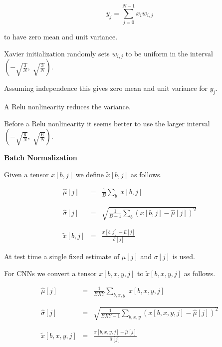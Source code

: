 {\vfill
$$y_j = \sum_{j=0}^{N-1} x_i w_{i,j}$$

\vfill
to have zero mean and unit variance.

\vfill
Xavier initialization randomly sets $w_{i,j}$ to be uniform in the interval $\left(-\sqrt{\frac{3}{N}},\;\sqrt{\frac{3}{N}}\right)$.

\vfill
Assuming independence this gives zero mean and unit variance for $y_j$.


A Relu nonlinearity reduces the variance.

\vfill
Before a Relu nonlinearity it seems better to use the larger interval $\left(-\sqrt{\frac{6}{N}},\;\sqrt{\frac{6}{N}}\right)$.

\slide{}
\centerline{\bf Batch Normalization}
\vfill

Given a tensor $x[b,j]$ we define $\tilde{x}[b,j]$ as follows.

\begin{eqnarray*}
  \hat{\mu}[j] & = & \frac{1}{B} \sum_b\;x[b,j] \\
  \\
  \\
  \hat{\sigma}[j] & = & \sqrt{\frac{1}{B-1} \sum_b (x[b,j]-\hat{\mu}[j])^2} \\
  \\
  \\
  \tilde{x}[b,j]& = & \frac{x[b,j] - \hat{\mu}[j]}{\hat{\sigma}[j]}
\end{eqnarray*}


\vfill
At test time a single fixed estimate of $\mu[j]$ and $\sigma[j]$ is used.


For CNNs we convert a tensor $x[b,x,y,j]$ to $\tilde{x}[b,x,y,j]$ as follows.

\begin{eqnarray*}
  \hat{\mu}[j] & = & \frac{1}{BXY} \sum_{b,x,y}\;x[b,x,y,j] \\
  \\
  \\
  \hat{\sigma}[j] & = & \sqrt{\frac{1}{BXY-1} \sum_{b,x,y} (x[b,x,y,j]-\hat{\mu}[j])^2} \\
  \\
  \\
  \tilde{x}[b,x,y,j]& = & \frac{x[b,x,y,j] - \hat{\mu}[j]}{\hat{\sigma}[j]}
\end{eqnarray*}


}
